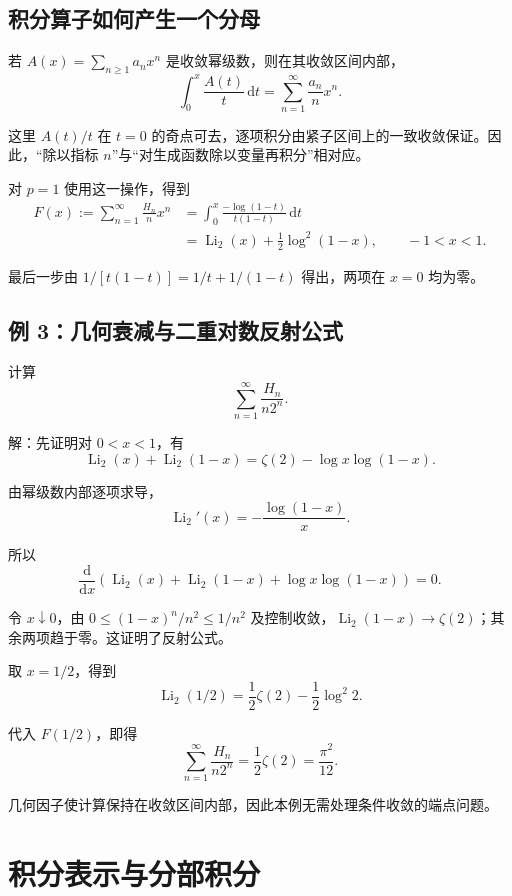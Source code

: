 \documentclass[11pt,a4paper]{article}
\begin{document}
\hypertarget{sec-4-2}{%
\subsection{积分算子如何产生一个分母}\label{sec-4-2}}

若 \(A(x)=\sum_{n\geqslant1}a_nx^n\) 是收敛幂级数，则在其收敛区间内部，
\[
\int_0^x\frac{A(t)}t\,\mathrm dt
=\sum_{n=1}^{\infty}\frac{a_n}{n}x^n.
\]

这里 \(A(t)/t\) 在 \(t=0\) 的奇点可去，逐项积分由紧子区间上的一致收敛保证。因此，``除以指标 \(n\)''与``对生成函数除以变量再积分''相对应。

对 \(p=1\) 使用这一操作，得到
\[
\begin{aligned}
F(x):=\sum_{n=1}^{\infty}\frac{H_n}{n}x^n
&=\int_0^x\frac{-\log(1-t)}{t(1-t)}\,\mathrm dt\\
&=\operatorname{Li}_2(x)+\frac12\log^2(1-x),
\qquad -1<x<1.
\end{aligned}
\]

最后一步由 \(1/[t(1-t)]=1/t+1/(1-t)\) 得出，两项在 \(x=0\) 均为零。

\hypertarget{sec-4-3}{%
\subsection{例 3：几何衰减与二重对数反射公式}\label{sec-4-3}}

计算
\[
\sum_{n=1}^{\infty}\frac{H_n}{n2^n}.
\]

\noindent

解：先证明对 \(0<x<1\)，有
\[
\operatorname{Li}_2(x)+\operatorname{Li}_2(1-x)
=\zeta(2)-\log x\log(1-x).
\]

由幂级数内部逐项求导，
\[
\operatorname{Li}_2'(x)=-\frac{\log(1-x)}x.
\]

所以
\[
\frac{\mathrm d}{\mathrm dx}
\left(\operatorname{Li}_2(x)+\operatorname{Li}_2(1-x)
+\log x\log(1-x)\right)=0.
\]

令 \(x\downarrow0\)，由 \(0\leqslant(1-x)^n/n^2\leqslant1/n^2\) 及控制收敛，\(\operatorname{Li}_2(1-x)\to\zeta(2)\)；其余两项趋于零。这证明了反射公式。

取 \(x=1/2\)，得到
\[
\operatorname{Li}_2(1/2)=\frac12\zeta(2)-\frac12\log^2 2.
\]

代入 \(F(1/2)\)，即得
\[
\sum_{n=1}^{\infty}\frac{H_n}{n2^n}
=\frac12\zeta(2)=\frac{\pi^2}{12}.
\]

几何因子使计算保持在收敛区间内部，因此本例无需处理条件收敛的端点问题。

\hypertarget{sec-5}{%
\section{积分表示与分部积分}\label{sec-5}}
\end{document}

